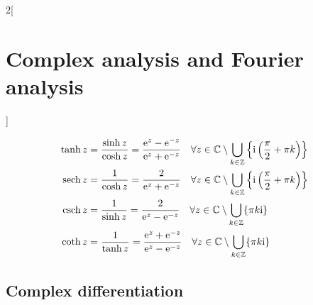 \documentclass[../../../main.tex]{subfiles}
\begin{document}
\begin{multicols}{2}[\section{Complex analysis and Fourier analysis}]
\begin{definition}
    \begin{align*}
      \tanh z & = \frac{\sinh z}{\cosh z}=\frac{\exp{z}-\exp{-z}}{\exp{z}+\exp{-z}}\quad \forall z\in\CC\setminus\bigcup_{k\in\ZZ}\left\{\ii\left(\frac{\pi}{2}+\pi k\right)\right\} \\
      \sech z & = \frac{1}{\cosh z}=\frac{2}{\exp{z}+\exp{-z}}\quad \forall z\in\CC\setminus\bigcup_{k\in\ZZ}\left\{\ii\left(\frac{\pi}{2}+\pi k\right)\right\}                      \\
      \csch z & = \frac{1}{\sinh z}=\frac{2}{\exp{z}-\exp{-z}}\quad\forall z\in\CC\setminus\bigcup_{k\in\ZZ}\{\pi k\ii\}                                                             \\
      \coth z & = \frac{1}{\tanh z}=\frac{\exp{z}+\exp{-z}}{\exp{z}-\exp{-z}}\quad\forall z\in\CC\setminus\bigcup_{k\in\ZZ}\{\pi k\ii\}
    \end{align*}
  \end{definition}
  \subsection{Complex differentiation}

\end{multicols}
\end{document}
